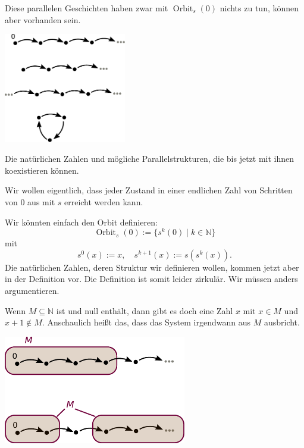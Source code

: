 \documentclass{beamer}
\newcommand{\N}{\mathbb N}
\newcommand{\imgcaption}[1]{{\small #1}}
\begin{document}
\begin{frame}
Diese parallelen Geschichten haben zwar mit
$\operatorname{Orbit}_s(0)$ nichts zu tun, können aber vorhanden sein.
\end{frame}

\begin{frame}
\begin{center}
\includegraphics[width=0.4\textwidth]{img/Parallelstrukturen.pdf}
\end{center}
\imgcaption{Die natürlichen Zahlen und mögliche Parallelstrukturen, die bis jetzt
mit ihnen koexistieren können.}
\end{frame}

\begin{frame}
Wir wollen eigentlich, dass jeder Zustand in einer endlichen Zahl
von Schritten von $0$ aus mit $s$ erreicht werden kann.
\end{frame}

\begin{frame}
Wir könnten einfach den Orbit definieren:
\[\operatorname{Orbit}_s(0) := \{s^k(0)\mid k\in\N\}\]
mit
\[s^0(x):=x,\quad s^{k+1}(x):=s(s^k(x)).\]
Die natürlichen Zahlen, deren Struktur wir definieren wollen,
kommen jetzt aber in der Definition vor. Die Definition ist
somit leider zirkulär. Wir müssen anders argumentieren.
\end{frame}

\begin{frame}
Wenn $M\subseteq\N$ ist und null enthält, dann gibt es doch
eine Zahl $x$ mit $x\in M$ und $x+1\notin M$. Anschaulich heißt das,
dass das System irgendwann aus $M$ ausbricht.
\end{frame}

\begin{frame}
\begin{center}
\includegraphics[width=0.6\textwidth]{img/Teilmengen.pdf}
\end{center}
\end{frame}
\end{document}

